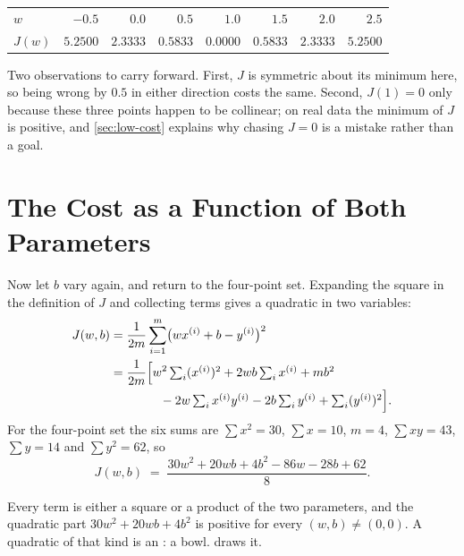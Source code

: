 \begin{center}
\small
\renewcommand{\arraystretch}{1.15}
\begin{tabular}{@{}lrrrrrrr@{}}
\toprule
$w$    & $-0.5$ & $0.0$ & $0.5$ & $1.0$ & $1.5$ & $2.0$ & $2.5$\\
$J(w)$ & $5.2500$ & $2.3333$ & $0.5833$ & $0.0000$ & $0.5833$ & $2.3333$ & $5.2500$\\
\bottomrule
\end{tabular}
\end{center}

Two observations to carry forward. First, $J$ is symmetric about its minimum
here, so being wrong by $0.5$ in either direction costs the same. Second,
$J(1)=0$ only because these three points happen to be collinear; on real data
the minimum of $J$ is positive, and \cref{sec:low-cost} explains why chasing
$J=0$ is a mistake rather than a goal.

\section{The Cost as a Function of Both Parameters}
\label{sec:cost-two-params}

Now let $b$ vary again, and return to the four-point set. Expanding the square
in the definition of $J$ and collecting terms gives a quadratic in two
variables:
\begin{align*}
  J(w,b) &= \frac{1}{2m}\sum_{i=1}^{m}\bigl(wx^{(i)}+b-y^{(i)}\bigr)^{2}\\
         &= \frac{1}{2m}\Bigl[
              w^{2}\textstyle\sum_i (x^{(i)})^{2}
            + 2wb\sum_i x^{(i)}
            + m b^{2}\\
         &\qquad\qquad
            - 2w\textstyle\sum_i x^{(i)}y^{(i)}
            - 2b\sum_i y^{(i)}
            + \sum_i (y^{(i)})^{2}
            \Bigr].
\end{align*}
For the four-point set the six sums are $\sum x^2 = 30$, $\sum x = 10$, $m=4$,
$\sum xy = 43$, $\sum y = 14$ and $\sum y^2 = 62$, so
\begin{equation}
  J(w,b) \;=\; \frac{30w^{2} + 20wb + 4b^{2} - 86w - 28b + 62}{8}.
  \label{eq:t4-cost}
\end{equation}

Every term is either a square or a product of the two parameters, and the
quadratic part $30w^2 + 20wb + 4b^2$ is positive for every $(w,b)\neq(0,0)$.
A quadratic of that kind is an : a bowl.
 draws it.

